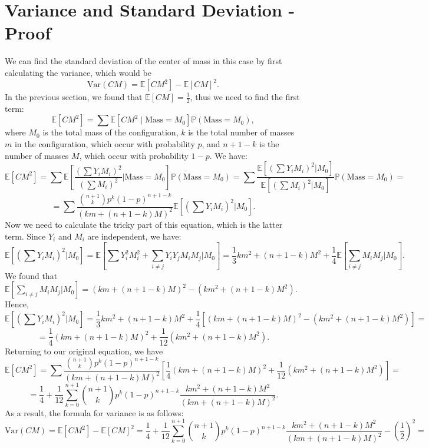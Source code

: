 \documentclass[11pt, twoside, reqno]{book}
\newcommand{\Var}{\text{Var}}
\newcommand{\E}{\mathbb{E}}
\begin{document}
\section{Variance and Standard Deviation - Proof}
\label{secB4}

We can find the standard deviation of the center of mass in this case by first calculating the variance, which would be
$$\Var(CM) = \E [CM^2] - \E [CM]^2.$$ 
In the previous section, we found that $\E [CM] = \frac{1}{2}$, thus we need to find the first term:
$$\E [CM^2] = \sum \E[CM^2 \mid \text{Mass} = M_{0}] \mathbb{P}(\text{Mass} = M_{0}),$$
where $M_{0}$ is the total mass of the configuration, $k$ is the total number of masses $m$ in the configuration, which occur with probability $p$, and $n+1-k$ is the number of masses $M$, which occur with probability $1-p$. We have:
$$\E [CM^2] =  \sum \E\left[ \frac{(\sum Y_{i}M_{i})^2}{(\sum M_{i})^2}  \Bigg| \text{Mass} = M_{0} \right] \mathbb{P} (\text{Mass} = M_{0}) = \sum \frac{\E [(\sum Y_{i}M_{i})^2 | M_{0}]}{\E[(\sum M_{i})^2 | M_{0}]} \mathbb{P} (\text{Mass} = M_{0}) = $$
$$= \sum \frac{\binom{n+1}{k} p^{k}(1-p)^{n+1-k}}{(km+(n+1-k)M)^2} \E \left[\left(\sum Y_{i}M_{i}\right)^2 \bigg| M_{0}\right].$$
Now we need to calculate the tricky part of this equation, which is the latter term. Since $Y_{i}$ and $M_{i}$ are independent, we have:
$$  \E \left[\left(\sum Y_{i}M_{i}\right)^2 \bigg| M_{0}\right] = \E \left[ \sum Y_{i}^{2}M_{i}^{2} + \sum_{i \neq j} Y_{i}Y_{j}M_{i}M_{j} \bigg| M_{0} \right] = \frac{1}{3} km^{2}+(n+1-k)M^{2} + \frac{1}{4} \E \left[ \sum_{i \neq j} M_{i}M_{j} \bigg| M_{0}\right].$$
We found that $\E \left[ \sum_{i \neq j} M_{i}M_{j} \big| M_{0}\right] = (km+(n+1-k)M)^{2} - (km^{2}+(n+1-k)M^{2})$. Hence, 
$$\E \left[\left(\sum Y_{i}M_{i}\right)^2 \bigg| M_{0}\right] =  \frac{1}{3} km^{2}+(n+1-k)M^{2} + \frac{1}{4} \left[(km+(n+1-k)M)^{2} - (km^{2}+(n+1-k)M^{2}) \right] = $$
$$=\frac{1}{4} (km+(n+1-k)M)^{2} + \frac{1}{12} \left( km^{2}+(n+1-k)M^{2}\right).$$
Returning to our original equation, we have
$$\E [CM^2] =\sum \frac{\binom{n+1}{k} p^{k}(1-p)^{n+1-k}}{(km+(n+1-k)M)^2} \left[ \frac{1}{4} (km+(n+1-k)M)^{2} + \frac{1}{12} \left( km^{2}+(n+1-k)M^{2}\right)\right]=$$
$$= \frac{1}{4} + \frac{1}{12} \sum^{n+1}_{k=0} \binom{n+1}{k} p^{k}(1-p)^{n+1-k}\frac{km^{2}+(n+1-k)M^{2}}{(km+(n+1-k)M)^2}.$$
As a result, the formula for variance is as follows:
$$\Var(CM) = \E[CM^{2}]-\E[CM]^2=\frac{1}{4} + \frac{1}{12} \sum^{n+1}_{k=0} \binom{n+1}{k} p^{k}(1-p)^{n+1-k}\frac{km^{2}+(n+1-k)M^{2}}{(km+(n+1-k)M)^2} - \left(\frac{1}{2}\right)^{2}= $$
\end{document}
